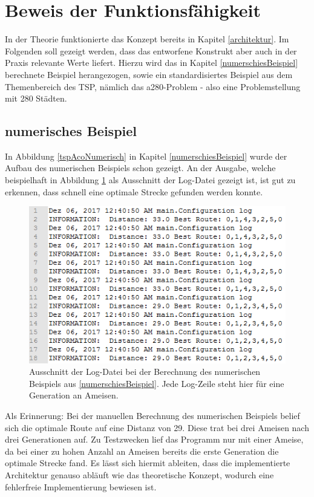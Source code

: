 \section{Beweis der Funktionsfähigkeit}
In der Theorie funktionierte das Konzept bereits in Kapitel \ref{architektur}. Im Folgenden soll gezeigt werden, dass das entworfene Konstrukt aber auch in der Praxis relevante Werte liefert. Hierzu wird das in Kapitel \ref{numerschiesBeispiel} berechnete Beispiel herangezogen, sowie ein standardisiertes Beispiel aus dem Themenbereich des \ac{TSP}, nämlich das a280-Problem - also eine Problemstellung mit 280 Städten.

\subsection{numerisches Beispiel}
In Abbildung \ref{tspAcoNumerisch} in Kapitel \ref{numerschiesBeispiel} wurde der Aufbau des numerischen Beispiels schon gezeigt. An der Ausgabe, welche beispielhaft in Abbildung \ref{numerischBeweis} als Ausschnitt der Log-Datei gezeigt ist, ist gut zu erkennen, dass schnell eine optimale Strecke gefunden werden konnte. 

\begin{figure}[H]
	\centering
	\includegraphics[width=0.5\linewidth]{images/numerischErgebnis.png}
	\caption{Ausschnitt der Log-Datei bei der Berechnung des numerischen Beispiels aus \ref{numerschiesBeispiel}. Jede Log-Zeile steht hier für eine Generation an Ameisen.}
	\label{numerischBeweis}
\end{figure}

\newpage
Als Erinnerung: Bei der manuellen Berechnung des numerischen Beispiels belief sich die optimale Route auf eine Distanz von 29. Diese trat bei drei Ameisen nach drei Generationen auf. Zu Testzwecken lief das Programm nur mit einer Ameise, da bei einer zu hohen Anzahl an Ameisen bereits die erste Generation die optimale Strecke fand. Es lässt sich hiermit ableiten, dass die implementierte Architektur genauso abläuft wie das theoretische Konzept, wodurch eine fehlerfreie Implementierung bewiesen ist.

